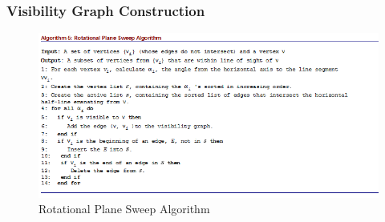 \documentclass[11pt]{article}
\begin{document}
\subsubsection{Visibility Graph Construction}
\begin{figure}[h]
	\centering
	\includegraphics{imgs/Algorithm_5.png}
	\caption{Rotational Plane Sweep Algorithm }
	\label{fig:Algorithm_5}
\end{figure}
\end{document}
